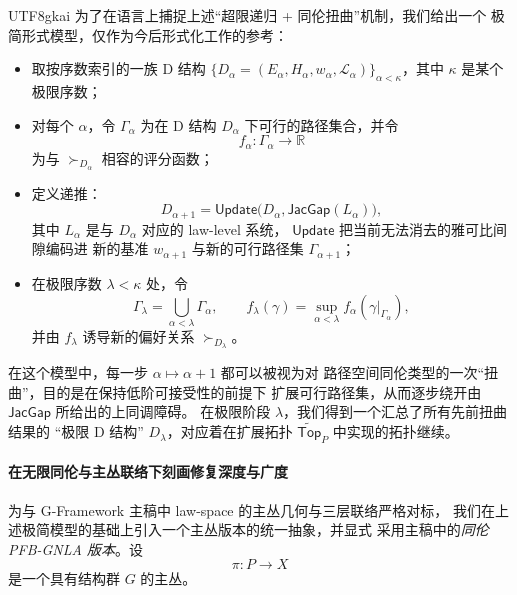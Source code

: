 \documentclass[12pt]{article}
\newcommand{\JacGap}{\mathsf{JacGap}}
\begin{document}
\begin{CJK*}{UTF8}{gkai}
为了在语言上捕捉上述“超限递归 + 同伦扭曲”机制，我们给出一个
极简形式模型，仅作为今后形式化工作的参考：
\begin{itemize}
  \item 取按序数索引的一族 D 结构
        $\{D_\alpha=(E_\alpha,H_\alpha,w_\alpha,\mathcal{L}_\alpha)\}
        _{\alpha<\kappa}$，其中 $\kappa$ 是某个极限序数；
  \item 对每个 $\alpha$，令 $\Gamma_\alpha$ 为在 D 结构 $D_\alpha$
        下可行的路径集合，并令
        \[
          f_\alpha:\Gamma_\alpha\longrightarrow\mathbb{R}
        \]
        为与 $\succ_{D_\alpha}$ 相容的评分函数；
  \item 定义递推：
        \[
          D_{\alpha+1}
          =
          \mathsf{Update}\bigl(
            D_\alpha,
            \JacGap(L_\alpha)
          \bigr),
        \]
        其中 $L_\alpha$ 是与 $D_\alpha$ 对应的 law-level 系统，
        $\mathsf{Update}$ 把当前无法消去的雅可比间隙编码进
        新的基准 $w_{\alpha+1}$ 与新的可行路径集 $\Gamma_{\alpha+1}$；
  \item 在极限序数 $\lambda<\kappa$ 处，令
        \[
          \Gamma_\lambda
          =
          \bigcup_{\alpha<\lambda}\Gamma_\alpha,
          \qquad
          f_\lambda(\gamma)
          =
          \sup_{\alpha<\lambda} f_\alpha(\gamma|_{\Gamma_\alpha}),
        \]
        并由 $f_\lambda$ 诱导新的偏好关系 $\succ_{D_\lambda}$。
\end{itemize}

在这个模型中，每一步 $\alpha\mapsto\alpha+1$ 都可以被视为对
路径空间同伦类型的一次“扭曲”，目的是在保持低阶可接受性的前提下
扩展可行路径集，从而逐步绕开由 $\JacGap$ 所给出的上同调障碍。
在极限阶段 $\lambda$，我们得到一个汇总了所有先前扭曲结果的
“极限 D 结构” $D_\lambda$，对应着在扩展拓扑
$\widetilde{\mathsf{Top}}_P$ 中实现的拓扑继续。

\paragraph{在无限同伦与主丛联络下刻画修复深度与广度}

为与 G-Framework 主稿中 law-space 的主丛几何与三层联络严格对标，
我们在上述极简模型的基础上引入一个主丛版本的统一抽象，并显式
采用主稿中的\emph{同伦 PFB-GNLA 版本}。设
\[
  \pi:P\longrightarrow X
\]
是一个具有结构群 $G$ 的主丛。


\end{CJK*}
\end{document}

